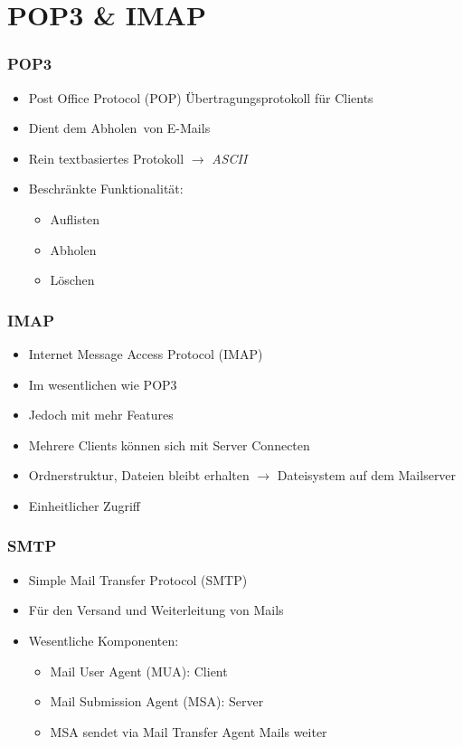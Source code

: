 \documentclass[xcolor=dvipsnames, aspectratio=169]{beamer}
\begin{document}
\section{POP3 \& IMAP}
\begin{frame}
	\frametitle{POP3 }
	\begin{itemize}
		\item Post Office Protocol (POP) Übertragungsprotokoll für Clients
		\item Dient dem \glqq Abholen\grqq\ von E-Mails
		\item Rein textbasiertes Protokoll $\rightarrow$ \emph{ASCII}
		\item Beschränkte Funktionalität:
		\begin{itemize}
			\item Auflisten
			\item Abholen
			\item Löschen
		\end{itemize}
	\end{itemize}
\end{frame}

\begin{frame}
	\frametitle{IMAP}
	\begin{itemize}
		\item Internet Message Access Protocol (IMAP)
		\item Im wesentlichen wie POP3
		\item Jedoch mit mehr Features
		\item Mehrere Clients können sich mit Server Connecten
		\item Ordnerstruktur, Dateien bleibt erhalten $\rightarrow$ Dateisystem auf dem Mailserver
		\item Einheitlicher Zugriff
	\end{itemize}
\end{frame}

\begin{frame}
	\frametitle{SMTP}
	\begin{itemize}
		\item Simple Mail Transfer Protocol (SMTP)
		\item Für den Versand und Weiterleitung von Mails
		\item Wesentliche Komponenten:
		\begin{itemize}
			\item Mail User Agent (MUA): Client
			\item Mail Submission Agent (MSA): Server
			\item MSA sendet via Mail Transfer Agent Mails weiter
		\end{itemize}
	\end{itemize}
	
\end{frame}
\end{document}
